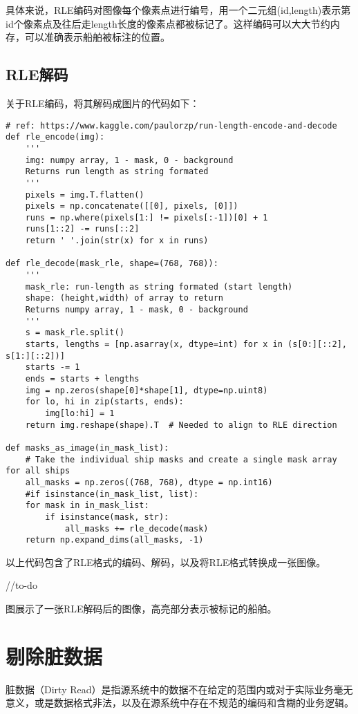 具体来说，RLE编码对图像每个像素点进行编号，用一个二元组(id,length)表示第id个像素点及往后走length长度的像素点都被标记了。这样编码可以大大节约内存，可以准确表示船舶被标注的位置。

\subsection{RLE解码}

关于RLE编码，将其解码成图片的代码如下：

\begin{verbatim}
# ref: https://www.kaggle.com/paulorzp/run-length-encode-and-decode
def rle_encode(img):
    '''
    img: numpy array, 1 - mask, 0 - background
    Returns run length as string formated
    '''
    pixels = img.T.flatten()
    pixels = np.concatenate([[0], pixels, [0]])
    runs = np.where(pixels[1:] != pixels[:-1])[0] + 1
    runs[1::2] -= runs[::2]
    return ' '.join(str(x) for x in runs)

def rle_decode(mask_rle, shape=(768, 768)):
    '''
    mask_rle: run-length as string formated (start length)
    shape: (height,width) of array to return 
    Returns numpy array, 1 - mask, 0 - background
    '''
    s = mask_rle.split()
    starts, lengths = [np.asarray(x, dtype=int) for x in (s[0:][::2], s[1:][::2])]
    starts -= 1
    ends = starts + lengths
    img = np.zeros(shape[0]*shape[1], dtype=np.uint8)
    for lo, hi in zip(starts, ends):
        img[lo:hi] = 1
    return img.reshape(shape).T  # Needed to align to RLE direction

def masks_as_image(in_mask_list):
    # Take the individual ship masks and create a single mask array for all ships
    all_masks = np.zeros((768, 768), dtype = np.int16)
    #if isinstance(in_mask_list, list):
    for mask in in_mask_list:
        if isinstance(mask, str):
            all_masks += rle_decode(mask)
    return np.expand_dims(all_masks, -1)
\end{verbatim}

以上代码包含了RLE格式的编码、解码，以及将RLE格式转换成一张图像。

//to-do

图展示了一张RLE解码后的图像，高亮部分表示被标记的船舶。

\section{剔除脏数据}

脏数据（Dirty
Read）是指源系统中的数据不在给定的范围内或对于实际业务毫无意义，或是数据格式非法，以及在源系统中存在不规范的编码和含糊的业务逻辑。

